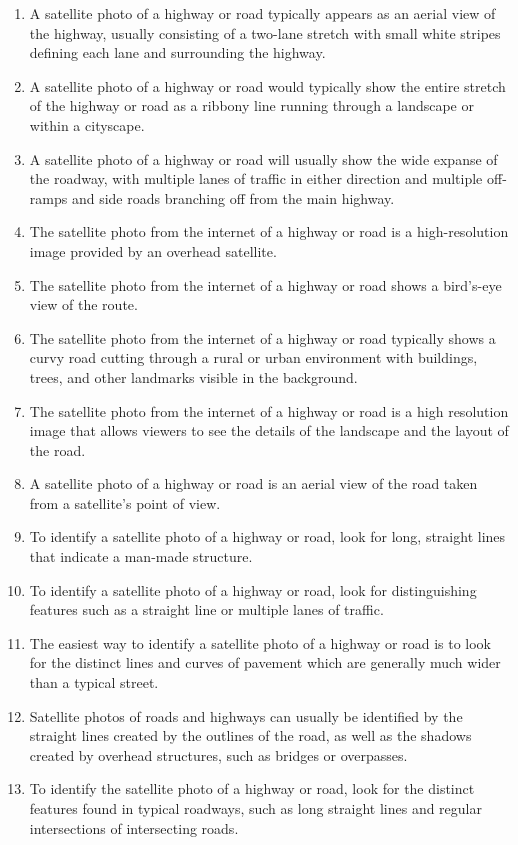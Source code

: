 \documentclass[11pt]{article}
\begin{document}
\begin{enumerate}
\item A satellite photo of a highway or road typically appears as an aerial view of the highway, usually consisting of a two-lane stretch with small white stripes defining each lane and surrounding the highway.
\item A satellite photo of a highway or road would typically show the entire stretch of the highway or road as a ribbony line running through a landscape or within a cityscape.
\item A satellite photo of a highway or road will usually show the wide expanse of the roadway, with multiple lanes of traffic in either direction and multiple off-ramps and side roads branching off from the main highway.
\item The satellite photo from the internet of a highway or road is a high-resolution image provided by an overhead satellite.
\item The satellite photo from the internet of a highway or road shows a bird's-eye view of the route.
\item The satellite photo from the internet of a highway or road typically shows a curvy road cutting through a rural or urban environment with buildings, trees, and other landmarks visible in the background.
\item The satellite photo from the internet of a highway or road is a high resolution image that allows viewers to see the details of the landscape and the layout of the road.
\item A satellite photo of a highway or road is an aerial view of the road taken from a satellite's point of view.
\item To identify a satellite photo of a highway or road, look for long, straight lines that indicate a man-made structure.
\item To identify a satellite photo of a highway or road, look for distinguishing features such as a straight line or multiple lanes of traffic.
\item
The easiest way to identify a satellite photo of a highway or road is to look for the distinct lines and curves of pavement which are generally much wider than a typical street.
\item Satellite photos of roads and highways can usually be identified by the straight lines created by the outlines of the road, as well as the shadows created by overhead structures, such as bridges or overpasses.
\item To identify the satellite photo of a highway or road, look for the distinct features found in typical roadways, such as long straight lines and regular intersections of intersecting roads.
\end{enumerate}
\end{document}
